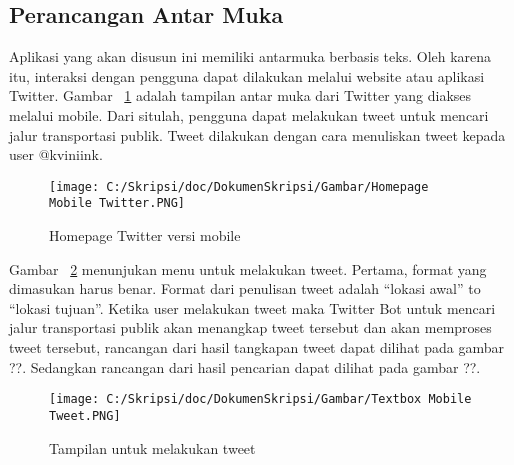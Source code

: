 \subsection{Perancangan Antar Muka}
Aplikasi yang akan disusun ini memiliki antarmuka berbasis teks. Oleh karena itu, interaksi dengan pengguna dapat dilakukan melalui website atau aplikasi Twitter. Gambar ~\ref{fig:Homepage Mobile Twitter} adalah tampilan antar muka dari Twitter yang diakses melalui mobile. Dari situlah, pengguna dapat melakukan tweet untuk mencari jalur transportasi publik. Tweet dilakukan dengan cara menuliskan tweet kepada user @kviniink.

\begin{figure}[htbp]
	\centering
		\texttt{[image: C:/Skripsi/doc/DokumenSkripsi/Gambar/Homepage Mobile Twitter.PNG]}
	\caption{Homepage Twitter versi mobile}
	\label{fig:Homepage Mobile Twitter}
\end{figure}

Gambar ~\ref{fig:Textbox Mobile Tweet} menunjukan menu untuk melakukan tweet. Pertama, format yang dimasukan harus benar. Format dari penulisan tweet adalah "`lokasi awal"' to "`lokasi tujuan"'. Ketika user melakukan tweet maka Twitter Bot untuk mencari jalur transportasi publik akan menangkap tweet tersebut dan akan memproses tweet tersebut, rancangan dari hasil tangkapan tweet dapat dilihat pada gambar ??. Sedangkan rancangan dari hasil pencarian dapat dilihat pada gambar ??.

\begin{figure}[hp]
	\centering
		\texttt{[image: C:/Skripsi/doc/DokumenSkripsi/Gambar/Textbox Mobile Tweet.PNG]}
	\caption{Tampilan untuk melakukan tweet}
	\label{fig:Textbox Mobile Tweet}
\end{figure}




